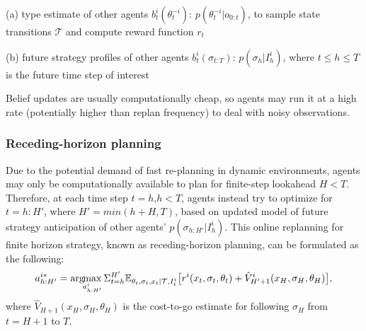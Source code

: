 \documentclass[letterpaper, 10 pt, conference]{ieeeconf}  %
\newcommand{\argmax}{\arg\!\!\max}
\begin{document}
(a) type estimate of other agents $b^i_t(\theta_t^{-i})$: 
$p(\theta^{-i}_t|o_{0:t})$, to sample state transitions $\mathcal{T}$ and 
compute reward function $r_t$

(b) future strategy profiles of other agents $b^i_t(\sigma_{t:T})$: 
    $p(\sigma_h|I^i_h)$, where $t\leq h\leq T$ is the future time step of interest

Belief updates are usually computationally cheap, so agents may run it at a high 
rate (potentially higher than replan frequency) to deal with noisy 
observations. 
\subsubsection{Receding-horizon planning}\label{sec:receding}
Due to the potential demand of fast re-planning in dynamic environments, 
agents may only be computationally available to plan for finite-step lookahead $H<T$.
Therefore, at each time step $t=h$,$h<T$, agents instead try to optimize
for $t=h:H'$, where $H'=min(h+H,T)$, based on updated model of future strategy 
anticipation of other agents' $p(\sigma_{h:H'}|I^i_h)$. This online replanning 
for finite horizon strategy, known as receding-horizon planning, can be formulated as the following:
\begin{equation}
  a^{i*}_{h:H'} = \argmax_{a^i_{h:H'}} 
  \Sigma_{t=h}^{H'} 
  \mathbb{E}_{\theta_t,\sigma_{t},x_t|\mathcal{T},I^i_t} \big{[}
  r^i(x_t,\sigma_t,\theta_t)+ \hat{V}^i_{H'+1}(x_H,\sigma_H,\theta_H)\big{]}, 
\end{equation}
where $\hat{V}_{H+1}(x_H,\sigma_H,\theta_H)$ is the cost-to-go estimate for 
following $\sigma_H$ from $t=H+1$ to $T$.
\end{document}
